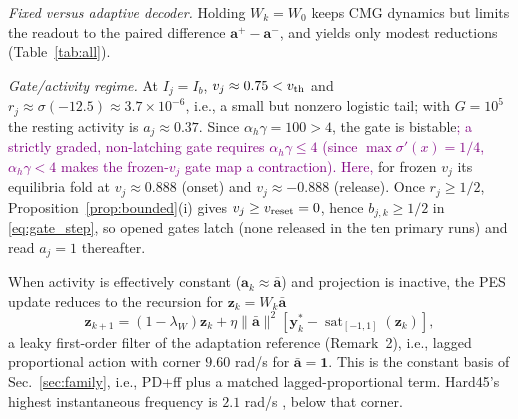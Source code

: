 \documentclass[letterpaper, 10 pt, conference]{ieeeconf}
\newcommand{\sat}{\operatorname{sat}}
\begin{document}
\emph{Fixed versus adaptive decoder.} Holding $W_k=W_0$ keeps CMG dynamics but limits the readout to the paired difference $\bm a^+-\bm a^-$, and yields only modest reductions (Table~\ref{tab:all}).

\emph{Gate/activity regime.} At $I_j=I_b$, $v_j\approx0.75<v_{\rm th}$ and $r_j\approx\sigma(-12.5)\approx3.7\times10^{-6}$, i.e., a small but nonzero logistic tail; with $G=10^5$ the resting activity is $a_j\approx0.37$. Since $\alpha_h\gamma=100>4$, the gate is bistable\textcolor{purple}{; a strictly graded, non-latching gate requires $\alpha_h\gamma\le4$ (since $\max\sigma'(x)=1/4$, $\alpha_h\gamma<4$ makes the frozen-$v_j$ gate map a contraction). Here,} for frozen $v_j$ its equilibria fold at $v_j\approx0.888$ (onset) and $v_j\approx-0.888$ (release). Once $r_j\ge1/2$, Proposition~\ref{prop:bounded}(i) gives $v_j\ge v_{\rm reset}=0$, hence $b_{j,k}\ge1/2$ in \eqref{eq:gate_step}, so opened gates latch (none released in the ten primary runs) and read $a_j=1$ thereafter.

When activity is effectively constant ($\bm a_k\approx\bar{\bm a}$) and projection is inactive, the PES update reduces to the recursion for $\bm z_k=W_k\bar{\bm a}$
\begin{equation}
 \bm z_{k+1}=(1-\lambda_W)\bm z_k
 +\eta\|\bar{\bm a}\|^2[\bm y_k^*-\sat_{[-1,1]}(\bm z_k)],
 \label{eq:constantbasis}
\end{equation}
a leaky first-order filter of the adaptation reference (Remark~2), i.e., lagged proportional action with corner $9.60$ rad/s for $\bar{\bm a}=\bm1$. This is the constant basis of Sec.~\ref{sec:family}, i.e., PD+ff plus a matched lagged-proportional term. Hard45's highest instantaneous frequency is $2.1$ rad/s \cite{sandoval2018instantaneous}, below that corner.
\end{document}
